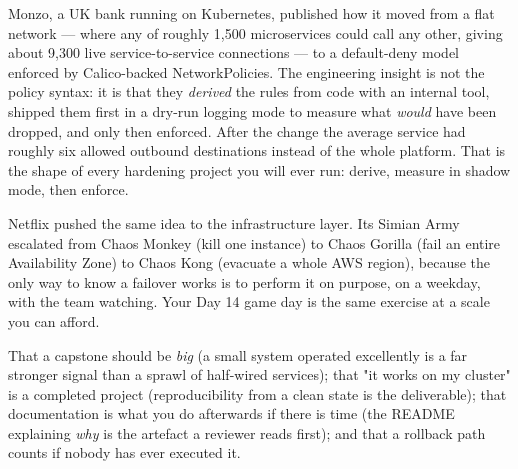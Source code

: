  Monzo, a UK bank running on Kubernetes, published how it moved from a flat network --- where any of roughly 1,500 microservices could call any other, giving about 9,300 live service-to-service connections --- to a default-deny model enforced by Calico-backed NetworkPolicies. The engineering insight is not the policy syntax: it is that they \emph{derived} the rules from code with an internal tool, shipped them first in a dry-run logging mode to measure what \emph{would} have been dropped, and only then enforced. After the change the average service had roughly six allowed outbound destinations instead of the whole platform. That is the shape of every hardening project you will ever run: derive, measure in shadow mode, then enforce.

Netflix pushed the same idea to the infrastructure layer. Its Simian Army escalated from Chaos Monkey (kill one instance) to Chaos Gorilla (fail an entire Availability Zone) to Chaos Kong (evacuate a whole AWS region), because the only way to know a failover works is to perform it on purpose, on a weekday, with the team watching. Your Day 14 game day is the same exercise at a scale you can afford.

 That a capstone should be \emph{big} (a small system operated excellently is a far stronger signal than a sprawl of half-wired services); that "it works on my cluster" is a completed project (reproducibility from a clean state is the deliverable); that documentation is what you do afterwards if there is time (the README explaining \emph{why} is the artefact a reviewer reads first); and that a rollback path counts if nobody has ever executed it.


